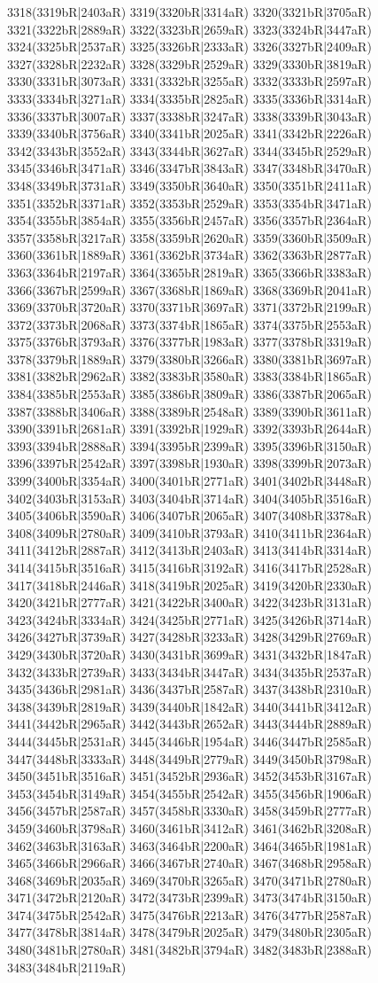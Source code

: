 3318(3319bR|2403aR) 3319(3320bR|3314aR) 3320(3321bR|3705aR) 3321(3322bR|2889aR) 3322(3323bR|2659aR) 3323(3324bR|3447aR) 3324(3325bR|2537aR) 3325(3326bR|2333aR) 3326(3327bR|2409aR) 3327(3328bR|2232aR) 3328(3329bR|2529aR) 3329(3330bR|3819aR) 3330(3331bR|3073aR) 3331(3332bR|3255aR) 3332(3333bR|2597aR) 3333(3334bR|3271aR) 3334(3335bR|2825aR) 3335(3336bR|3314aR) 3336(3337bR|3007aR) 3337(3338bR|3247aR) 3338(3339bR|3043aR) 3339(3340bR|3756aR) 3340(3341bR|2025aR) 3341(3342bR|2226aR) 3342(3343bR|3552aR) 3343(3344bR|3627aR) 3344(3345bR|2529aR) 3345(3346bR|3471aR) 3346(3347bR|3843aR) 3347(3348bR|3470aR) 3348(3349bR|3731aR) 3349(3350bR|3640aR) 3350(3351bR|2411aR) 3351(3352bR|3371aR) 3352(3353bR|2529aR) 3353(3354bR|3471aR) 3354(3355bR|3854aR) 3355(3356bR|2457aR) 3356(3357bR|2364aR) 3357(3358bR|3217aR) 3358(3359bR|2620aR) 3359(3360bR|3509aR) 3360(3361bR|1889aR) 3361(3362bR|3734aR) 3362(3363bR|2877aR) 3363(3364bR|2197aR) 3364(3365bR|2819aR) 3365(3366bR|3383aR) 3366(3367bR|2599aR) 3367(3368bR|1869aR) 3368(3369bR|2041aR) 3369(3370bR|3720aR) 3370(3371bR|3697aR) 3371(3372bR|2199aR) 3372(3373bR|2068aR) 3373(3374bR|1865aR) 3374(3375bR|2553aR) 3375(3376bR|3793aR) 3376(3377bR|1983aR) 3377(3378bR|3319aR) 3378(3379bR|1889aR) 3379(3380bR|3266aR) 3380(3381bR|3697aR) 3381(3382bR|2962aR) 3382(3383bR|3580aR) 3383(3384bR|1865aR) 3384(3385bR|2553aR) 3385(3386bR|3809aR) 3386(3387bR|2065aR) 3387(3388bR|3406aR) 3388(3389bR|2548aR) 3389(3390bR|3611aR) 3390(3391bR|2681aR) 3391(3392bR|1929aR) 3392(3393bR|2644aR) 3393(3394bR|2888aR) 3394(3395bR|2399aR) 3395(3396bR|3150aR) 3396(3397bR|2542aR) 3397(3398bR|1930aR) 3398(3399bR|2073aR) 3399(3400bR|3354aR) 3400(3401bR|2771aR) 3401(3402bR|3448aR) 3402(3403bR|3153aR) 3403(3404bR|3714aR) 3404(3405bR|3516aR) 3405(3406bR|3590aR) 3406(3407bR|2065aR) 3407(3408bR|3378aR) 3408(3409bR|2780aR) 3409(3410bR|3793aR) 3410(3411bR|2364aR) 3411(3412bR|2887aR) 3412(3413bR|2403aR) 3413(3414bR|3314aR) 3414(3415bR|3516aR) 3415(3416bR|3192aR) 3416(3417bR|2528aR) 3417(3418bR|2446aR) 3418(3419bR|2025aR) 3419(3420bR|2330aR) 3420(3421bR|2777aR) 3421(3422bR|3400aR) 3422(3423bR|3131aR) 3423(3424bR|3334aR) 3424(3425bR|2771aR) 3425(3426bR|3714aR) 3426(3427bR|3739aR) 3427(3428bR|3233aR) 3428(3429bR|2769aR) 3429(3430bR|3720aR) 3430(3431bR|3699aR) 3431(3432bR|1847aR) 3432(3433bR|2739aR) 3433(3434bR|3447aR) 3434(3435bR|2537aR) 3435(3436bR|2981aR) 3436(3437bR|2587aR) 3437(3438bR|2310aR) 3438(3439bR|2819aR) 3439(3440bR|1842aR) 3440(3441bR|3412aR) 3441(3442bR|2965aR) 3442(3443bR|2652aR) 3443(3444bR|2889aR) 3444(3445bR|2531aR) 3445(3446bR|1954aR) 3446(3447bR|2585aR) 3447(3448bR|3333aR) 3448(3449bR|2779aR) 3449(3450bR|3798aR) 3450(3451bR|3516aR) 3451(3452bR|2936aR) 3452(3453bR|3167aR) 3453(3454bR|3149aR) 3454(3455bR|2542aR) 3455(3456bR|1906aR) 3456(3457bR|2587aR) 3457(3458bR|3330aR) 3458(3459bR|2777aR) 3459(3460bR|3798aR) 3460(3461bR|3412aR) 3461(3462bR|3208aR) 3462(3463bR|3163aR) 3463(3464bR|2200aR) 3464(3465bR|1981aR) 3465(3466bR|2966aR) 3466(3467bR|2740aR) 3467(3468bR|2958aR) 3468(3469bR|2035aR) 3469(3470bR|3265aR) 3470(3471bR|2780aR) 3471(3472bR|2120aR) 3472(3473bR|2399aR) 3473(3474bR|3150aR) 3474(3475bR|2542aR) 3475(3476bR|2213aR) 3476(3477bR|2587aR) 3477(3478bR|3814aR) 3478(3479bR|2025aR) 3479(3480bR|2305aR) 3480(3481bR|2780aR) 3481(3482bR|3794aR) 3482(3483bR|2388aR) 3483(3484bR|2119aR) 
